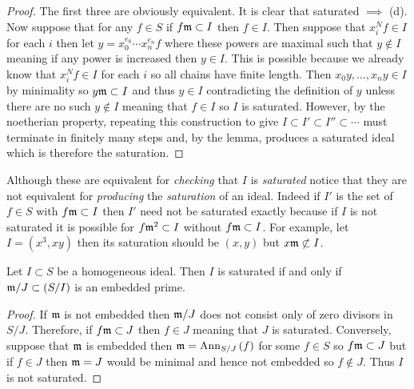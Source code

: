 \documentclass[12pt]{article}
\begin{document}
\begin{proof}
The first three are obviously equivalent. It is clear that saturated $\implies$ (d). Now suppose that for any $f \in S$ if $f \mathfrak{m} \subset I$ then $f \in I$. Then suppose that $x_i^{N} f \in I$ for each $i$ then let $y = x_0^{e_0} \cdots x_n^{e_n} f$ where these powers are maximal such that $y \notin I$ meaning if any power is increased then $y \in I$. This is possible because we already know that $x_i^N f \in I$ for each $i$ so all chains have finite length. Then $x_0 y, \dots, x_n y \in I$ by minimality so $y \mathfrak{m} \subset I$ and thus $y \in I$ contradicting the definition of $y$ unless there are no such $y \notin I$ meaning that $f \in I$ so $I$ is saturated. However, by the noetherian property, repeating this construction to give $I \subset I' \subset I'' \subset \cdots$ must terminate in finitely many steps and, by the lemma, produces a saturated ideal which is therefore the saturation.
\end{proof}

\begin{rmk}
Although these are equivalent for \textit{checking} that $I$ is \textit{saturated} notice that they are not equivalent for \textit{producing} the \textit{saturation} of an ideal. Indeed if $I'$ is the set of $f \in S$ with $f \mathfrak{m} \subset I$ then $I'$ need not be saturated exactly because if $I$ is not saturated it is possible for $f \mathfrak{m}^2 \subset I$ without $f \mathfrak{m} \subset I$. For example, let $I = (x^3, xy)$ then its saturation should be $(x,y)$ but $x \mathfrak{m} \not \subset I$. 
\end{rmk}

\begin{lemma}
Let $I \subset S$ be a homogeneous ideal. Then $I$ is saturated if and only if $\mathfrak{m}/J \subset (S/I)$ is an embedded prime.
\end{lemma}

\begin{proof}
If $\mathfrak{m}$ is not embedded then $\mathfrak{m}/J$ does not consist only of zero divisors in $S/J$. Therefore,  if $f \mathfrak{m} \subset J$ then $f \in J$ meaning that $J$ is saturated. Conversely, suppose that $\mathfrak{m}$ is embedded then $\mathfrak{m} = \mathrm{Ann}_{S/J}\left(f\right)$ for some $f \in S$ so $f \mathfrak{m} \subset J$ but if $f \in J$ then $\mathfrak{m} = J$ would be minimal and hence not embedded so $f \notin J$. Thus $I$ is not saturated. 
\end{proof}
\end{document}
